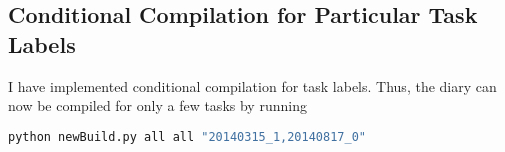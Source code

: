 \subsection{Conditional Compilation for Particular Task Labels}
\label{task:20140817_jkn0}
I have implemented conditional compilation for task labels. Thus, the diary can now be compiled for only a few tasks by running
\begin{lstlisting}[language=bash]
python newBuild.py all all "20140315_1,20140817_0"
\end{lstlisting}

